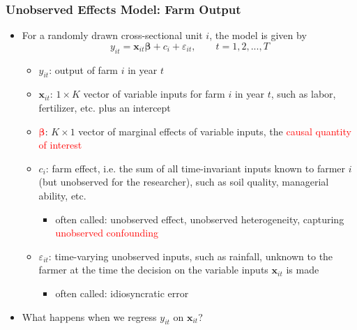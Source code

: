 \documentclass[xcolor=svgnames,9pt,english, aspectratio=169]{beamer}
\newcommand{\red}{\textcolor{red}}
\newcommand{\bs}{\boldsymbol}
\newcommand{\mb}{\mathbf}
\newcommand{\x}{\ensuremath{\mb{x}}}
\renewcommand{\b}{\ensuremath{\bs{\beta}}}
\begin{document}
\begin{frame}
  \frametitle{Unobserved Effects Model: Farm Output}
\small
\begin{itemize}
\item For a randomly drawn cross-sectional unit $i$, the model is given by
\[
y_{it} = \x_{it}\b + c_i + \varepsilon_{it}, \quad \quad t=1,2,...,T
\]\vspace{-.2in}
\begin{itemize}[<+->]
  \item $y_{it}$: output of farm $i$ in year $t$\medskip
  \item $\x_{it}$: $1 \times K$ vector of variable inputs  for farm $i$ in year $t$, such as labor, fertilizer, etc. plus an intercept\medskip
  \item \red{$\b$}:  $K \times 1$ vector of marginal effects of variable inputs, the \red{causal quantity of interest}\medskip
  \item $c_i$: farm effect, i.e. the sum of all time-invariant inputs known to farmer $i$ (but unobserved for the researcher), such as soil quality, managerial ability, etc.
  \begin{itemize}
  \item often called: \alert{unobserved effect}, \alert{unobserved heterogeneity}, capturing \red{unobserved confounding}
\end{itemize}\medskip
\item $\varepsilon_{it}$: time-varying unobserved inputs, such as rainfall, unknown to the farmer
at the time the decision on the variable inputs $\x_{it}$ is made
\begin{itemize}
  \item often called: \alert{idiosyncratic error}
\end{itemize}
\end{itemize}\pause
\item What happens when we regress $y_{it}$ on $\x_{it}$?
\end{itemize}
\end{frame}
\end{document}
